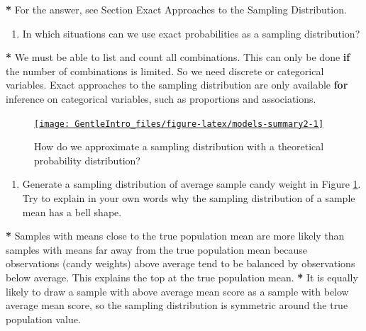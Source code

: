 \documentclass[a4paper]{book}
\newenvironment{Shaded}{\begin{snugshade}}{\end{snugshade}}
\newcommand{\StringTok}[1]{\textcolor[rgb]{0.00,0.00,0.00}{#1}}
\newcommand{\ControlFlowTok}[1]{\textcolor[rgb]{0.00,0.00,0.00}{\textbf{#1}}}
\newcommand{\OperatorTok}[1]{\textcolor[rgb]{0.00,0.00,0.00}{\textbf{#1}}}
\newcommand{\NormalTok}[1]{#1}
\providecommand{\tightlist}{%
  \setlength{\itemsep}{0pt}\setlength{\parskip}{0pt}}
\theoremstyle{definition}
\theoremstyle{definition}
\theoremstyle{definition}
\theoremstyle{remark}
\begin{document}
\begin{Shaded}
\begin{Highlighting}[]
\OperatorTok{*}\StringTok{ }\NormalTok{For the answer, see Section Exact Approaches to the Sampling Distribution.}
\end{Highlighting}
\end{Shaded}

\begin{enumerate}
\def\labelenumi{\arabic{enumi}.}
\setcounter{enumi}{4}
\tightlist
\item
  In which situations can we use exact probabilities as a sampling
  distribution?
\end{enumerate}

\begin{Shaded}
\begin{Highlighting}[]
\OperatorTok{*}\StringTok{ }\NormalTok{We must be able to list and count all combinations. This can only be done }\ControlFlowTok{if}
\NormalTok{the number of combinations is limited. So we need discrete or categorical}
\NormalTok{variables. Exact approaches to the sampling distribution are only available}
\ControlFlowTok{for}\NormalTok{ inference on categorical variables, such as proportions and associations.}
\end{Highlighting}
\end{Shaded}

\begin{figure}[H]
\href{http://82.196.4.233:3838/apps/normal-approximation/}{\texttt{[image: GentleIntro\_files/figure-latex/models-summary2-1]} }\caption{How do we approximate a sampling distribution with a theoretical probability distribution?}\label{fig:models-summary2}
\end{figure}

\begin{enumerate}
\def\labelenumi{\arabic{enumi}.}
\setcounter{enumi}{5}
\tightlist
\item
  Generate a sampling distribution of average sample candy weight in
  Figure \ref{fig:models-summary2}. Try to explain in your own words why
  the sampling distribution of a sample mean has a bell shape.
\end{enumerate}

\begin{Shaded}
\begin{Highlighting}[]
\OperatorTok{*}\StringTok{ }\NormalTok{Samples with means close to the true population mean are more likely than}
\NormalTok{samples with means far away from the true population mean because observations}
\NormalTok{(candy weights) above average tend to be balanced by observations below}
\NormalTok{average. This explains the top at the true population mean.}
\OperatorTok{*}\StringTok{ }\NormalTok{It is equally likely to draw a sample with above average mean score as a}
\NormalTok{sample with below average mean score, so the sampling distribution is}
\NormalTok{symmetric around the true population value.}
\end{Highlighting}
\end{Shaded}
\end{document}
